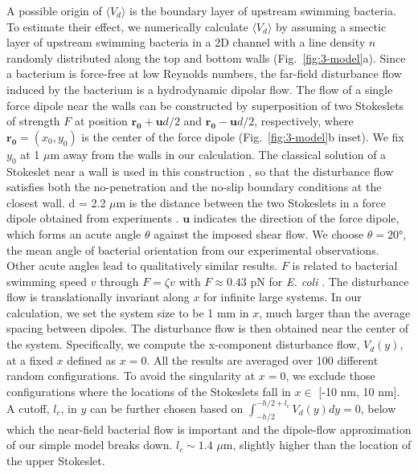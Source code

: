 A possible origin of $\langle V_d \rangle$ is the boundary layer of upstream swimming bacteria. To estimate their effect, we numerically calculate $\langle V_d \rangle$ by assuming a smectic layer of upstream swimming bacteria in a 2D channel with a line density $n$ randomly distributed along the top and bottom walls (Fig.~\ref{fig:3-model}a). Since a bacterium is force-free at low Reynolds numbers, the far-field disturbance flow induced by the bacterium is a hydrodynamic dipolar flow. The flow of a single force dipole near the walls can be constructed by superposition of two Stokeslets of strength $F$ at position $\mathbf{r_0} + \mathbf{u}d/2$ and $\mathbf{r_0} - \mathbf{u}d/2$, respectively, where $\mathbf{r_0} = (x_0, y_0)$ is the center of the force dipole (Fig.~\ref{fig:3-model}b inset). We fix $y_0$ at 1 $\mu$m away from the walls in our calculation. The classical solution of a Stokeslet near a wall is used in this construction \cite{Blake1971}, so that the disturbance flow satisfies both the no-penetration and the no-slip boundary conditions at the closest wall. d = 2.2 $\mu$m is the distance between the two Stokeslets in a force dipole obtained from experiments \cite{Drescher2011}. $\mathbf{u}$ indicates the direction of the force dipole, which forms an acute angle $\theta$ against the imposed shear flow. We choose $\theta = 20$°, the mean angle of bacterial orientation from our experimental observations. Other acute angles lead to qualitatively similar results.
$F$ is related to bacterial swimming speed $v$ through $F = \zeta v$ with $F \approx 0.43$ pN for \textit{E. coli} \cite{Drescher2011}. The disturbance flow is translationally invariant along $x$ for infinite large systems. In our calculation, we set the system size to be 1 mm in $x$, much larger than the average spacing between dipoles. The disturbance flow is then obtained near the center of the system. Specifically, we compute the x-component disturbance flow, $V_d(y)$, at a fixed $x$ defined as $x = 0$. All the results are averaged over 100 different random configurations. To avoid the singularity at $x = 0$, we exclude those configurations where the locations of the Stokeslets fall in $x \in$ [-10 nm, 10 nm]. A cutoff, $l_c$, in $y$ can be further chosen based on $\int_{-h/2}^{-h/2+l_c} V_d(y)dy = 0$, below which the near-field bacterial flow is important and the dipole-flow approximation of our simple model breaks down. $l_c \sim 1.4$ $\mu$m, slightly higher than the location of the upper Stokeslet.

